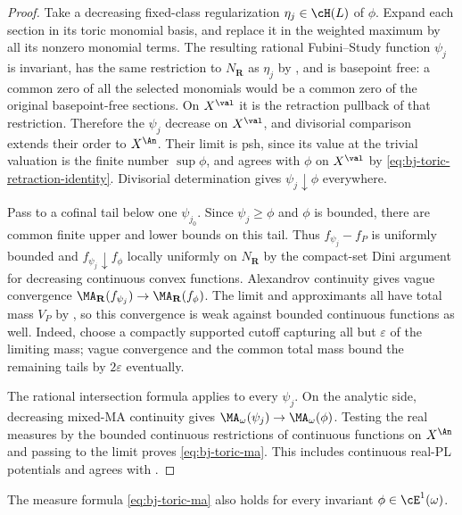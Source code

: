 \begin{proof}
Take a decreasing fixed-class regularization $\eta_j\in\cH(L)$ of
$\phi$.  Expand each section in its toric monomial basis, and replace
it in the weighted maximum by all its nonzero monomial terms.
The resulting rational Fubini--Study function $\psi_j$ is invariant,
has the same restriction to $N_{\mathbf R}$ as $\eta_j$ by
, and is basepoint free:
a common zero of all the selected monomials would be a common zero
of the original basepoint-free sections.  On $X^{\val}$ it is
the retraction pullback of that restriction.  Therefore the
$\psi_j$ decrease on $X^{\val}$, and divisorial comparison extends
their order to $X^{\An}$.  Their limit is psh, since its value at
the trivial valuation is the finite number $\sup\phi$, and agrees
with $\phi$ on $X^{\val}$ by
\eqref{eq:bj-toric-retraction-identity}.  Divisorial determination
gives $\psi_j\downarrow\phi$ everywhere.

Pass to a cofinal tail below one $\psi_{j_0}$.
Since $\psi_j\ge\phi$ and $\phi$ is bounded, there are common finite
upper and lower bounds on this tail.  Thus
$f_{\psi_j}-f_P$ is uniformly bounded and
$f_{\psi_j}\downarrow f_\phi$ locally uniformly on $N_{\mathbf R}$
by the compact-set Dini argument for decreasing continuous convex
functions.  Alexandrov continuity gives vague convergence
$\MA_{\mathbf R}(f_{\psi_j})\to\MA_{\mathbf R}(f_\phi)$.
The limit and approximants all have total mass $V_P$ by
, so this convergence is weak against
bounded continuous functions as well.  Indeed, choose a compactly
supported cutoff capturing all but $\varepsilon$ of the limiting
mass; vague convergence and the common total mass bound the
remaining tails by $2\varepsilon$ eventually.

The rational intersection formula
 applies to every $\psi_j$.
On the analytic side, decreasing mixed-MA continuity gives
$\MA_\omega(\psi_j)\to\MA_\omega(\phi)$.
Testing the real measures by the bounded continuous restrictions of
continuous functions on $X^{\An}$ and passing to the limit proves
\eqref{eq:bj-toric-ma}.  This includes continuous real-PL potentials
and agrees with \cite[Appendix~B, p.~831]{BJ22}.
\end{proof}

\begin{corollary}
\label{cor:ch49-toric-ma-e1}
The measure formula \eqref{eq:bj-toric-ma} also holds for every
invariant $\phi\in\cE^1(\omega)$.
\end{corollary}

